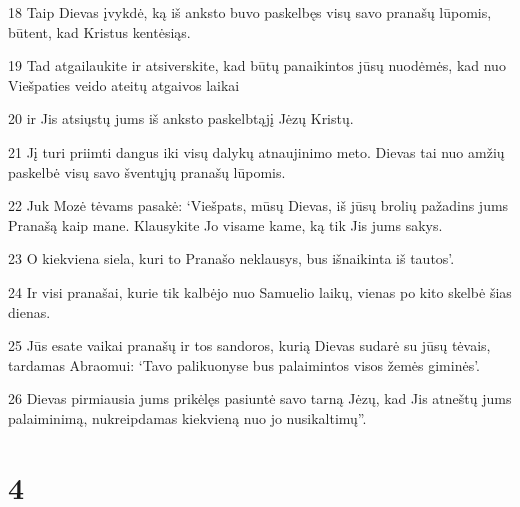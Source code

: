 \par 18 Taip Dievas įvykdė, ką iš anksto buvo paskelbęs visų savo pranašų lūpomis, būtent, kad Kristus kentėsiąs. 
\par 19 Tad atgailaukite ir atsiverskite, kad būtų panaikintos jūsų nuodėmės, kad nuo Viešpaties veido ateitų atgaivos laikai 
\par 20 ir Jis atsiųstų jums iš anksto paskelbtąjį Jėzų Kristų. 
\par 21 Jį turi priimti dangus iki visų dalykų atnaujinimo meto. Dievas tai nuo amžių paskelbė visų savo šventųjų pranašų lūpomis. 
\par 22 Juk Mozė tėvams pasakė: ‘Viešpats, mūsų Dievas, iš jūsų brolių pažadins jums Pranašą kaip mane. Klausykite Jo visame kame, ką tik Jis jums sakys. 
\par 23 O kiekviena siela, kuri to Pranašo neklausys, bus išnaikinta iš tautos’. 
\par 24 Ir visi pranašai, kurie tik kalbėjo nuo Samuelio laikų, vienas po kito skelbė šias dienas. 
\par 25 Jūs esate vaikai pranašų ir tos sandoros, kurią Dievas sudarė su jūsų tėvais, tardamas Abraomui: ‘Tavo palikuonyse bus palaimintos visos žemės giminės’. 
\par 26 Dievas pirmiausia jums prikėlęs pasiuntė savo tarną Jėzų, kad Jis atneštų jums palaiminimą, nukreipdamas kiekvieną nuo jo nusikaltimų”.


\chapter{4}


